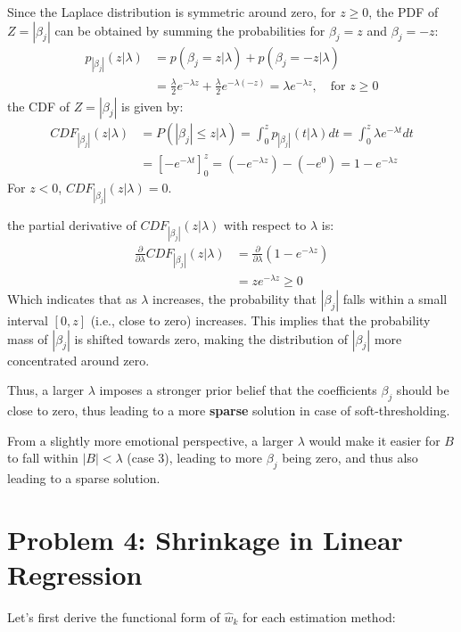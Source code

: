\documentclass[11pt, a4paper, oneside]{memoir}
\begin{document}
Since the Laplace distribution is symmetric around zero,
for $z \geq 0$, the PDF of $Z = |\beta_j|$ can be obtained by summing the probabilities for $\beta_j = z$ and $\beta_j = -z$:
\begin{align*}
    p_{|\beta_j|}(z | \lambda) & = p(\beta_j = z | \lambda) + p(\beta_j = -z | \lambda)                                                                        \\
                               & = \frac{\lambda}{2} e^{-\lambda z} + \frac{\lambda}{2} e^{-\lambda (-z)} = \lambda e^{-\lambda z}, \quad \text{for } z \geq 0
\end{align*}
the CDF of $Z = |\beta_j|$ is given by:
\begin{align*}
    CDF_{|\beta_j|}(z | \lambda) & = P(|\beta_j| \leq z | \lambda) = \int_0^z p_{|\beta_j|}(t | \lambda) dt = \int_0^z \lambda e^{-\lambda t} dt \\
                                 & = \left[ -e^{-\lambda t} \right]_0^z = (-e^{-\lambda z}) - (-e^0) = 1 - e^{-\lambda z}
\end{align*}
For $z < 0$, $CDF_{|\beta_j|}(z | \lambda) = 0$.

the partial derivative of $CDF_{|\beta_j|}(z | \lambda)$ with respect to $\lambda$ is:
\begin{align*}
    \frac{\partial}{\partial \lambda} CDF_{|\beta_j|}(z | \lambda) & = \frac{\partial}{\partial \lambda} (1 - e^{-\lambda z}) \\
                                                                   & = z e^{-\lambda z} \geq 0
\end{align*}
Which indicates that as $\lambda$ increases, the probability that $|\beta_j|$ falls within a small interval $[0, z]$ (i.e., close to zero) increases.
This implies that the probability mass of $|\beta_j|$ is shifted towards zero, making the distribution of $|\beta_j|$ more concentrated around zero.

Thus, a larger $\lambda$ imposes a stronger prior belief that the coefficients $\beta_j$ should be close to zero,
thus leading to a more \textbf{sparse} solution in case of soft-thresholding.

From a slightly more emotional perspective, a larger $\lambda$ would make it easier for $B$ to fall within $|B|<\lambda$ (case 3),
leading to more $\beta_j$ being zero, and thus also leading to a sparse solution.

\chapter{Problem 4: Shrinkage in Linear Regression}
Let's first derive the functional form of $\hat{w}_k$ for each estimation method:
\end{document}
